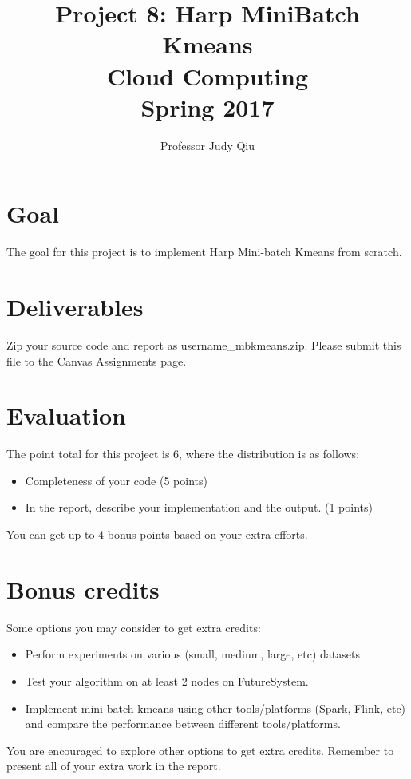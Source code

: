 \documentclass{article}
\begin{document}
\title{Project 8: Harp Mini\-Batch Kmeans\\ Cloud Computing\\ Spring 2017}         %
\author{Professor Judy Qiu }        %
\date{}
\maketitle
\makeatother     %
\pagestyle{plain}
\section*{Goal}
The goal for this project is to implement Harp\cite{Harp} Mini-batch Kmeans from scratch. 

\section*{Deliverables}
Zip your source code and report as username\_mbkmeans.zip. Please submit this file to the Canvas Assignments page.

\section*{Evaluation}

The point total for this project is 6, where the distribution is as follows:
\begin{itemize}
\item Completeness of your code (5 points)
\item In the report, describe your implementation and the output. (1 points)
\end{itemize}
 You can get up to 4 bonus points based on your  extra efforts.
\section*{Bonus credits}

Some options you may consider to get extra credits: 
\begin{itemize}
\item Perform experiments on various (small, medium, large, etc) datasets 
\item Test your algorithm on at least 2 nodes on FutureSystem.
\item Implement mini-batch kmeans using other tools/platforms (Spark\cite{Spark}, Flink\cite{Flink}, etc) and compare the performance between different tools/platforms.
\end{itemize}
You are encouraged to explore other options to get extra credits. Remember to present all of your extra work in the report.
 
\end{document}
